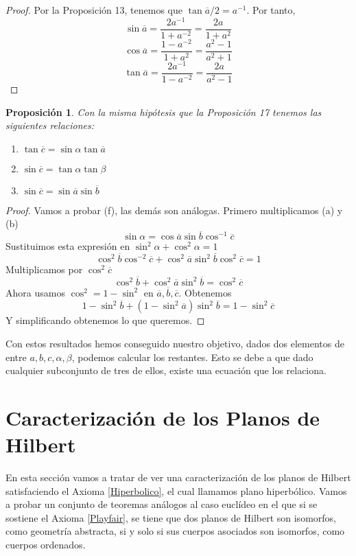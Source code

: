 \documentclass[a4paper]{amsart}
\theoremstyle{plain}
\newtheorem{proposition}{Proposición}
\begin{document}
\begin{proof}
Por la Proposición 13, tenemos que $\tan \overline{a}/2=a^{-1}$. Por tanto,
\[
\sin \overline{a}=\frac{2a^{-1}}{1+a^{-2}}=\frac{2a}{1+a^2}
\]
\[
\cos \overline{a}=\frac{1-a^{-2}}{1+a^2}=\frac{a^2-1}{a^2+1}
\]
\[
\tan \overline{a}=\frac{2a^{-1}}{1-a^{-2}}=\frac{2a}{a^2-1}
\]
\end{proof}

\begin{proposition}
Con la misma hipótesis que la Proposición 17 tenemos las siguientes relaciones:
\begin{enumerate}
\item [(d)] $\tan \overline{c}=\sin\alpha\tan\overline{a}$
\item [(e)] $\sin\overline{c}=\tan\alpha\tan\beta$
\item [(f)] $\sin\overline{c}=\sin\overline{a}\sin\overline{b}$
\end{enumerate}
\end{proposition}

\begin{proof}
Vamos a probar (f), las demás son análogas. Primero multiplicamos (a) y (b)
\[
\sin \alpha=\cos\overline{a}\sin\overline{b}\cos^{-1}\overline{c}
\]
Sustituimos esta expresión en $\sin^2\alpha + \cos^2 \alpha=1$
\[
\cos^2 \overline{b}\cos^{-2}\overline{c}+\cos^2 \overline{a}\sin^2 \overline{b}\cos^2\overline{c}=1
\]
Multiplicamos por $\cos^2\overline{c}$
\[
\cos^2 \overline{b}+\cos^2 \overline{a}\sin^2 \overline{b}=\cos^2\overline{c}
\]
Ahora usamos $\cos^2=1-\sin ^2$ en $\overline{a},\overline{b},\overline{c}$. Obtenemos
\[
1-\sin^2\overline{b}+(1-\sin^2\overline{a})\sin^2\overline{b}=1-\sin^2\overline{c}
\]
Y simplificando obtenemos lo que queremos.
\end{proof}
Con estos resultados hemos conseguido nuestro objetivo, dados dos elementos de entre $a,b,c,\alpha,\beta$, podemos calcular los restantes. Esto se debe a que dado cualquier subconjunto de tres de ellos, existe una ecuación que los relaciona.

\section{Caracterización de los Planos de Hilbert}
En esta sección vamos a tratar de ver una caracterización de los planos de Hilbert satisfaciendo el Axioma \ref{Hiperbolico}, el cual llamamos plano hiperbólico. Vamos a probar un conjunto de teoremas análogos al caso euclídeo en el que si se sostiene el Axioma \ref{Playfair}, se tiene que dos planos de Hilbert son isomorfos, como geometría abstracta, si y solo si sus cuerpos asociados son isomorfos, como cuerpos ordenados.
\end{document}
